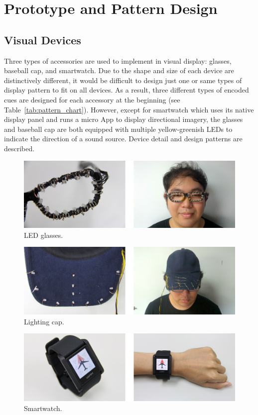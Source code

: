 \documentclass{sigchi}
\begin{document}
\section{Prototype and Pattern Design}

\subsection{Visual Devices}
Three types of accessories are used to implement in visual display: glasses, baseball cap, and smartwatch. Due to the shape and size of each device are distinctively different, it would be difficult to design just one or same types of display pattern to fit on all devices. As a result, three different types of encoded cues are designed for each accessory at the beginning (see Table~\ref{tab:pattern_chart}). However, except for smartwatch which uses its native display panel and runs a micro App to display directional imagery, the glasses and baseball cap are both equipped with multiple yellow-greenish LEDs to indicate the direction of a sound source. Device detail and design patterns are described.

\begin{figure}[!t]
\centering
\includegraphics[width=0.9\columnwidth]{glasses_4}
\caption{LED glasses.}
\label{fig:glasses}
\end{figure}

\begin{figure}[!t]
\centering
\includegraphics[width=0.9\columnwidth]{cap_4}
\caption{Lighting cap.}
\label{fig:cap}
\end{figure}

\begin{figure}[!t]
\centering
\includegraphics[width=0.9\columnwidth]{smartwatch_4}
\caption{Smartwatch.}
\label{fig:watch}
\end{figure}
\end{document}
